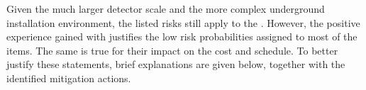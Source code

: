 Given the much larger detector scale and the more complex underground installation environment, the listed risks still %
apply to the . However, the positive experience gained with  justifies the low risk probabilities assigned to most of the items. The same is true for their impact on the cost and schedule.  To better justify these statements, brief explanations are given below, together with the identified mitigation actions.


